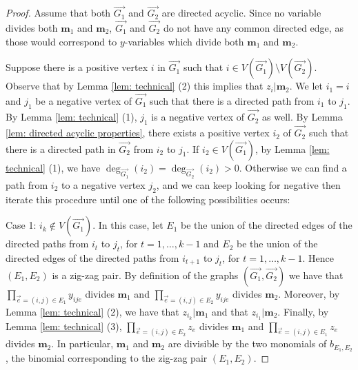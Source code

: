 \begin{proof}
     Assume that both $\overrightarrow{G_1}$ and $\overrightarrow{G_2}$ are directed acyclic. Since no variable divides both $\mathbf{m}_1$ and $\mathbf{m}_2$, $\overrightarrow{G_1}$ and $\overrightarrow{G_2}$ do not have any common directed edge, as those would correspond to $y$-variables which divide both $\mathbf{m}_1$ and $\mathbf{m}_2$.
     
     Suppose there is a positive vertex $i$ in $\overrightarrow{G_1}$ such that $i\in V(\overrightarrow{G_1})\setminus V(\overrightarrow{G_2})$. Observe that by Lemma \ref{lem: technical} (2) this implies that $z_i|\mathbf{m}_2$. 
     We let $i_1=i$ and $j_1$ be a negative vertex of $\overrightarrow{G_1}$ such that there is a directed path from $i_1$ to $j_1$. 
     By Lemma \ref{lem: technical} (1), $j_1$ is a negative vertex of $\overrightarrow{G_2}$ as well. 
     By Lemma \ref{lem: directed acyclic properties}, there exists a positive vertex $i_2$ of $\overrightarrow{G_2}$ such that there is a directed path in $\overrightarrow{G_2}$ from $i_2$ to $j_1$. If $i_2\in V(\overrightarrow{G_1})$, by Lemma \ref{lem: technical} (1), we have $\deg_{\overrightarrow{G_1}}(i_2)=\deg_{\overrightarrow{G_2}}(i_2)>0$. 
     Otherwise we can find a path from $i_2$ to a negative vertex $j_2$, and we can keep looking for negative then iterate this procedure until one of the following possibilities occurs:
     
     {\sf Case 1:} $i_k\notin V(\overrightarrow{G_1})$. In this case, let $E_1$ be the union of the directed edges of the directed paths from $i_t$ to $j_t$, for $t=1,\dots,k-1$ and $E_2$ be the union of the directed edges of the directed paths from $i_{t+1}$ to $j_t$, for $t=1,\dots,k-1$. Hence $(E_1,E_2)$ is a zig-zag pair. By definition of the graphs $(\overrightarrow{G_1},\overrightarrow{G_2})$ we have that $\prod_{\overset{\to}{e}=(i,j)\in E_1}y_{ije}$ divides $\mathbf{m}_1$ and $\prod_{\overset{\to}{e}=(i,j)\in E_2}y_{ije}$ divides $\mathbf{m}_2$. Moreover, by Lemma \ref{lem: technical} (2), we have that $z_{i_k}|\mathbf{m}_1$ and that $z_{i_1}|\mathbf{m}_2$. Finally, by Lemma \ref{lem: technical} (3), $\prod_{\overset{\to}{e}=(i,j)\in E_2} z_e$ divides $\mathbf{m}_1$ and $\prod_{\overset{\to}{e}=(i,j)\in E_1} z_e$ divides $\mathbf{m}_2$. 
      In particular, $\mathbf{m}_1$ and $\mathbf{m}_2$ are divisible by the two monomials of $b_{E_1,E_2}$, the binomial corresponding to the zig-zag pair $(E_1,E_2)$.
      

\end{proof}
